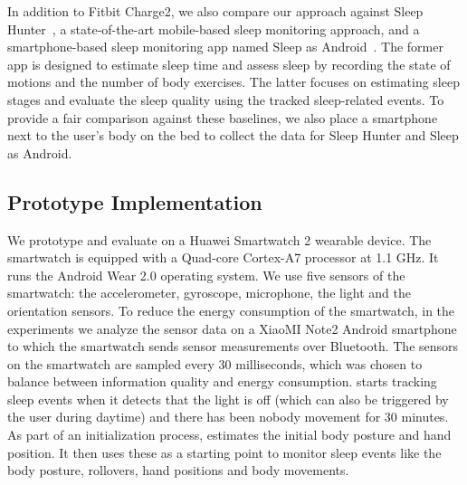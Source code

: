  In addition to Fitbit Charge2, we also compare our approach against Sleep Hunter~\cite{gu2016sleep}, a
state-of-the-art mobile-based sleep monitoring approach, and a smartphone-based sleep monitoring app named Sleep as
Android~\cite{SleepAndroid}. The former app is designed to estimate sleep time and assess sleep by recording the state of motions and the
number of body exercises. The latter focuses on estimating sleep stages and evaluate the sleep quality using the tracked sleep-related
events. To provide a fair comparison against these baselines, we also place a smartphone next to the user's body on the bed to collect the
data for Sleep Hunter and Sleep as Android.
	





\subsection{Prototype Implementation \label{sec:implementation}}
We prototype and evaluate {\systemname} on a Huawei Smartwatch 2 wearable device. The smartwatch is equipped with a Quad-core Cortex-A7
processor at 1.1 GHz. It runs the Android Wear 2.0 operating system. We use five sensors of the smartwatch: the accelerometer, gyroscope,
microphone, the light and the orientation sensors. To reduce the energy consumption of the smartwatch, in the experiments we analyze the
sensor data on a XiaoMI Note2 Android smartphone to which the smartwatch sends sensor measurements over Bluetooth. The sensors on the
smartwatch are sampled every $30$ milliseconds, which was chosen to balance between information quality and energy consumption.
{\systemname} starts tracking sleep events when it detects that the light is off (which can also be triggered by the user during daytime)
and there has been nobody movement for 30 minutes. As part of an initialization process, {\systemname} estimates the initial body posture
and hand position. It then uses these as a starting point to monitor sleep events like the body posture, rollovers, hand positions and body
movements.
